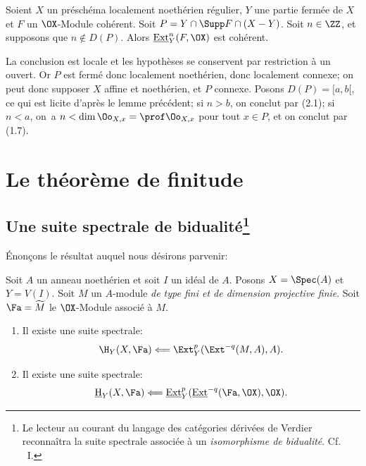 \begin{proposition}\label{VII.2.3} Soient $X$ un pr\'esch\'ema localement noeth\'erien r\'egulier, $Y$ une partie ferm\'ee de $X$ et $F$ un $\OX$-Module coh\'erent. Soit $P = Y \cap \Supp F \cap (X - Y)$. Soit $n \in \ZZ$, et supposons que $n \not\in D(P)$. Alors $\mathop{\underline{\mathrm{Ext}}}\nolimits^n_Y (F, \OX)$ est coh\'erent.
\end{proposition}

La conclusion est locale et les hypoth\`eses se conservent par restriction \`a un ouvert. Or $P$ est ferm\'e donc localement noeth\'erien, donc localement connexe; on peut donc supposer $X$ affine et noeth\'erien, et $P$ connexe. Posons $D(P) = [a, b[$, ce qui est licite d'apr\`es le lemme pr\'ec\'edent; si $n> b$, on conclut par (2.1); si $n < a$, on~a \hbox{$n < \dim \Oo_{X, x} = \prof \Oo_{X, x}$} pour tout $x \in P$, et on conclut par (1.7).

\chapter{Le th\'eor\`eme de finitude} \label{VIII}

\section[Une suite spectrale de bidualit\'e]
{Une suite spectrale de bidualit\'e\footnote{Le lecteur au courant du
langage des cat\'egories d\'eriv\'ees de Verdier reconna\^itra la suite
spectrale associ\'ee \`a un \emph{isomorphisme de bidualité}. Cf. ~I.}}\label{VIII.1}

\renewcommand{\theequation}{\thesection.\arabic{equation}}

\'Enon\c cons le r\'esultat auquel nous d\'esirons parvenir:

\begin{proposition} \label{VIII.1.1} Soit $A$ un anneau noeth\'erien et soit $I$ un id\'eal de $A$. Posons $X=\Spec(A)$ et $Y=V(I)$. Soit $M$ un $A$-module \emph{de type fini et de dimension projective finie}. Soit ${\Fa}=\widetilde{M}$ le $\OX$-Module associ\'e \`a $M$.
\begin{enumerate}
\item[\textup{1)}] Il existe une suite spectrale:
\[
\H_Y(X, {\Fa}) \Longleftarrow \Ext^p_Y(\Ext^{-q}(M, A), A).
\]

\item[\textup{2)}] Il existe une suite spectrale:
\[
\mathop{\underline{\mathrm{H}}}\nolimits_Y(X, {\Fa}) \Longleftarrow \mathop{\underline{\mathrm{Ext}}}\nolimits^p_Y(\mathop{\underline{\mathrm{Ext}}}\nolimits^{-q}({\Fa}, \OX), \OX).
\]
\end{enumerate}
\end{proposition}


